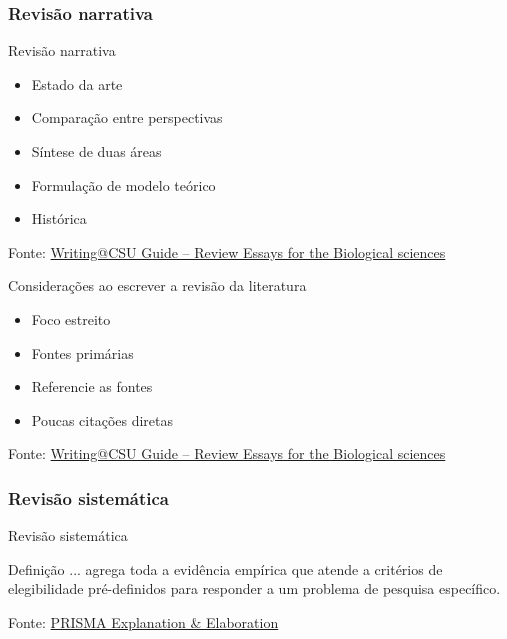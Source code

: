 \documentclass{beamer}
\begin{document}
\subsubsection[Narrativa]{Revisão narrativa}

\begin{frame}{Revisão narrativa}
  \begin{itemize}
    \scriptsize
  \item Estado da arte
    \bigskip
  \item Comparação entre perspectivas
    \bigskip
  \item Síntese de duas áreas
    \bigskip
  \item Formulação de modelo teórico
    \bigskip
  \item Histórica
  \end{itemize}

  \vfill
  \scriptsize
  \hfill Fonte: \href{https://writing.colostate.edu/guides/guide.cfm?guideid=79}
  {\tiny Writing@CSU Guide -- Review Essays for the Biological sciences}
\end{frame}

\begin{frame}{Considerações ao escrever a revisão da literatura}
  \begin{itemize}
    \footnotesize
  \item Foco estreito
    \bigskip
  \item Fontes primárias
    \bigskip
  \item Referencie as fontes
    \bigskip
  \item Poucas citações diretas
  \end{itemize}

  \vfill
  \scriptsize
  \hfill Fonte: \href{https://writing.colostate.edu/guides/guide.cfm?guideid=79}
  {\tiny Writing@CSU Guide -- Review Essays for the Biological sciences}
\end{frame}

\subsubsection[Sistemática]{Revisão sistemática}

\begin{frame}{Revisão sistemática}
  \begin{block}{Definição}
    \footnotesize
    ... agrega toda a evidência empírica que atende a critérios de elegibilidade pré-definidos para responder a um problema de pesquisa específico.
  \end{block}

  \vfill
  \scriptsize
  \hfill Fonte: \href{https://doi.org/10.1371/journal.pmed.1000100}
  {\tiny PRISMA Explanation \& Elaboration}
\end{frame}
\end{document}
